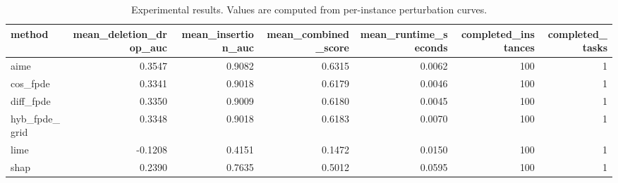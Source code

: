 \begin{table}[t]
\caption{Experimental results. Values are computed from per-instance perturbation curves.}
\label{tab:main_results_computed}
\centering
\begin{tabular}{lrrrrrr}
\toprule
method & mean\_deletion\_drop\_auc & mean\_insertion\_auc & mean\_combined\_score & mean\_runtime\_seconds & completed\_instances & completed\_tasks \\
\midrule
aime & 0.3547 & 0.9082 & 0.6315 & 0.0062 & 100 & 1 \\
cos\_fpde & 0.3341 & 0.9018 & 0.6179 & 0.0046 & 100 & 1 \\
diff\_fpde & 0.3350 & 0.9009 & 0.6180 & 0.0045 & 100 & 1 \\
hyb\_fpde\_grid & 0.3348 & 0.9018 & 0.6183 & 0.0070 & 100 & 1 \\
lime & -0.1208 & 0.4151 & 0.1472 & 0.0150 & 100 & 1 \\
shap & 0.2390 & 0.7635 & 0.5012 & 0.0595 & 100 & 1 \\
\bottomrule
\end{tabular}

\end{table}
